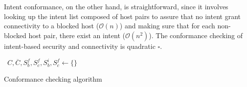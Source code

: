 \documentclass[conference]{IEEEtran}
\begin{document}
Intent conformance, on the other hand, is straightforward, since it involves looking up the intent list composed of host pairs to assure that no intent grant connectivity to a blocked host ($\mathcal{O}(n)$) and making sure that for each non-blocked host pair, there exist an intent ($\mathcal{O}(n^2)$). The conformance checking of intent-based security and connectivity is quadratic $\square$.

\begin{algorithm}
  \
$C, \overline{C}, S^f_b, S^f_c, S^i_b, S^f_c \gets \{ \}$ \;
  \caption{Conformance checking algorithm \label{algo:conformance-checking}}
 \end{algorithm}



\end{document}
